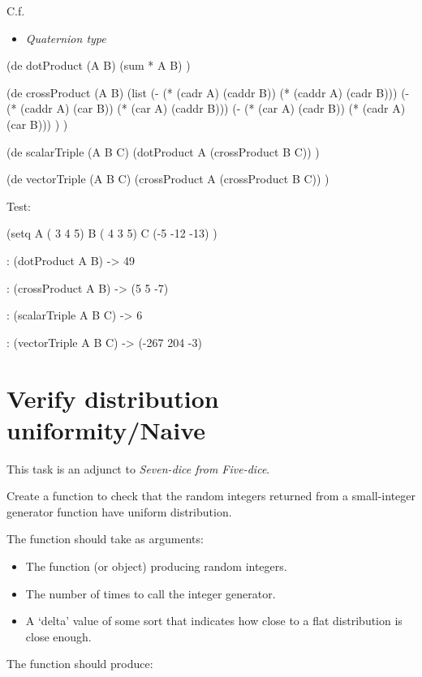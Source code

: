 C.f.

\begin{itemize}
\item
  \emph{Quaternion type}
\end{itemize}



\begin{wideverbatim}

(de dotProduct (A B)
   (sum * A B) )

(de crossProduct (A B)
   (list
      (- (* (cadr A) (caddr B)) (* (caddr A) (cadr B)))
      (- (* (caddr A) (car B)) (* (car A) (caddr B)))
      (- (* (car A) (cadr B)) (* (cadr A) (car B))) ) )

(de scalarTriple (A B C)
   (dotProduct A (crossProduct B C)) )

(de vectorTriple (A B C)
   (crossProduct A (crossProduct B C)) )

Test:

(setq
   A ( 3   4   5)
   B ( 4   3   5)
   C (-5 -12 -13) )

: (dotProduct A B)
-> 49

: (crossProduct A B)
-> (5 5 -7)

: (scalarTriple A B C)
-> 6

: (vectorTriple A B C)
-> (-267 204 -3)

\end{wideverbatim}

\pagebreak{}
\section*{Verify distribution uniformity/Naive}

This task is an adjunct to \emph{Seven-dice from Five-dice}.

Create a function to check that the random integers returned from a
small-integer generator function have uniform distribution.

The function should take as arguments:

\begin{itemize}
\item
  The function (or object) producing random integers.
\item
  The number of times to call the integer generator.
\item
  A `delta' value of some sort that indicates how close to a flat
  distribution is close enough.
\end{itemize}

The function should produce:


